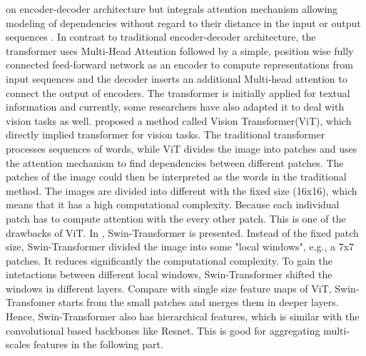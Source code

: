     on encoder-decoder architecture but integrals attention mechanism allowing modeling of dependencies without regard to their distance in the input or output sequences \cite{NIPS2017_3f5ee243}.
    In contrast to traditional encoder-decoder architecture, the transformer uses Multi-Head Attention followed by a simple, position wise fully connected feed-forward network as an encoder 
    to compute representations from input sequences and the decoder inserts an additional Multi-head attention to connect the output of encoders. 
    The transformer is initially applied for textual information and currently, some researchers have also adapted it to deal with vision tasks as well.
    \cite{dosovitskiy2021an} proposed a method called Vision Transformer(ViT), which directly implied transformer for vision tasks. The traditional transformer processes sequences of words,
    while ViT divides the image into patches and uses the attention mechanism to find dependencies between different patches. The patches of the image could then be interpreted as the words 
    in the traditional method. The images are divided into different with the fixed size (16x16), which means that it has a high computational complexity. Because each individual patch has 
    to compute attention with the every other patch. This is one of the drawbacks of ViT. In \cite{9710580}, Swin-Transformer is presented. Instead of the fixed patch size,  Swin-Transformer
    divided the image into some "local windows", e.g., a 7x7 patches. It reduces significantly the computational complexity. To gain the intetactions between different local windows, 
    Swin-Transformer shifted the windows in different layers. Compare with single size feature maps of ViT, Swin-Transfomer starts from the small patches and merges them in deeper layers. Hence,
    Swin-Transformer also has hierarchical features, which is similar with the convolutional based backbones like Resnet. This is good for aggregating multi-scales features in the following part.
